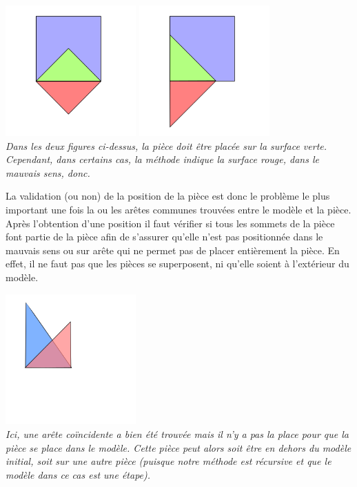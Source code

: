 \documentclass[a4paper, 11pt]{report}
\begin{document}
    \begin{center}
    \includegraphics[width=5cm]{place_figure_probleme_symetrie_1}
    \includegraphics[width=5cm]{place_figure_probleme_symetrie_2}\\
    \emph{Dans les deux figures ci-dessus, la pièce doit être placée sur la surface verte. Cependant, dans certains cas, la méthode indique la surface rouge, dans le mauvais sens, donc.}
    \end{center}

	La validation (ou non) de la position de la pièce est donc le problème le plus important une fois la ou les arêtes communes trouvées entre le modèle et la pièce. Après l'obtention d'une position il faut vérifier si tous les sommets de la pièce font partie de la pièce afin de s'assurer qu'elle n'est pas positionnée dans le mauvais sens ou sur arête qui ne permet pas de placer entièrement la pièce. En effet, il ne faut pas que les pièces se superposent, ni qu'elle soient à l'extérieur du modèle.

    \begin{center}
    \includegraphics[width=5cm]{place_figure_probleme_point}\\
    \emph{Ici, une arête coïncidente a bien été trouvée mais il n'y a pas la place pour que la pièce se place dans le modèle. Cette pièce peut alors soit être en dehors du modèle initial, soit sur une autre pièce (puisque notre méthode est récursive et que le modèle dans ce cas est une étape).}\\
    \end{center}
\end{document}
